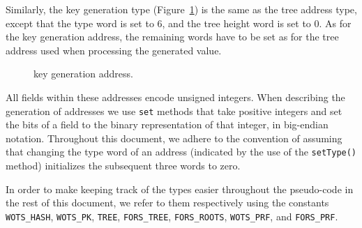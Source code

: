 Similarly, the \fors key generation type (Figure~\ref{fig:adrs:forskg}) is the same as the \fors tree address type, except that the type word is set to 6, and the tree height word is set to 0. As for the \wotsp key generation address, the remaining words have to be set as for the \fors tree address used when processing the generated value.
\begin{figure}[h]
  \centering
  \caption{\fors key generation address.}
  \label{fig:adrs:forskg}
\end{figure}

   All fields within these addresses encode unsigned integers.  When
   describing the generation of addresses we use \texttt{set} methods that
   take positive integers and set the bits of a field to the binary
   representation of that integer, in big-endian
   notation. Throughout this document, we adhere to the convention
   of assuming that changing the type word of an address
   (indicated by the use of the \texttt{setType()} method)
   initializes the subsequent three words to zero.

   In order to make keeping track of the types easier throughout the pseudo-code in
   the rest of this document, we refer to them respectively using the constants
   \texttt{WOTS\_HASH}, \texttt{WOTS\_PK}, \texttt{TREE}, \texttt{FORS\_TREE}, \texttt{FORS\_ROOTS}, \texttt{WOTS\_PRF}, and \texttt{FORS\_PRF}.
